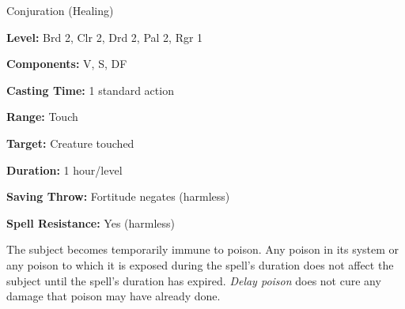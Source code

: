 
Conjuration (Healing)

\textbf{Level:} Brd 2, Clr 2, Drd 2, Pal 2, Rgr 1

\textbf{Components:} V, S, DF

\textbf{Casting Time:} 1 standard action

\textbf{Range:} Touch

\textbf{Target:} Creature touched

\textbf{Duration:} 1 hour/level

\textbf{Saving Throw:} Fortitude negates (harmless)

\textbf{Spell Resistance:} Yes (harmless)

The subject becomes temporarily immune to poison. Any poison in its system or any 
poison to which it is exposed during the spell's duration does not affect the subject 
until the spell's duration has expired. \textit{Delay poison} does not cure any 
damage that poison may have already done.

